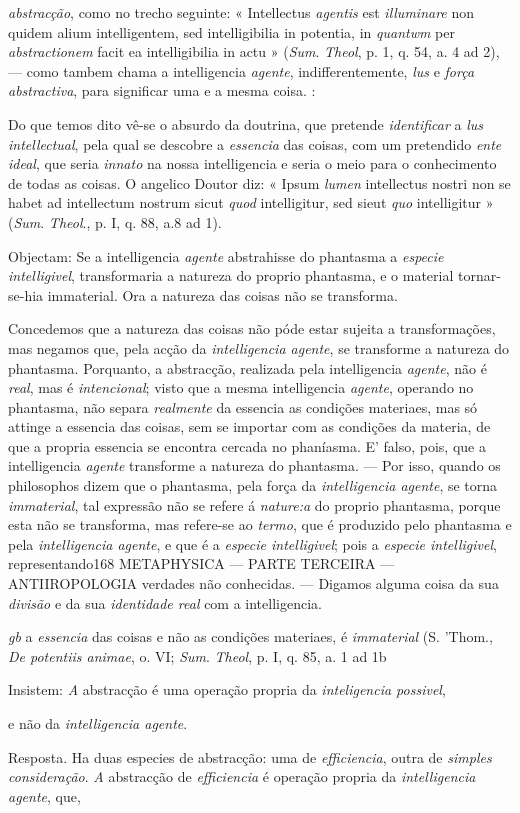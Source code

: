 \emph{abstracção}, como no trecho seguinte: « Intellectus \emph{agentis} est \emph{illuminare} non quidem alium intelligentem, sed intelligibilia in potentia, in \emph{quantwm} per \emph{abstractionem} facit ea intelligibilia in actu » (\emph{Sum}. \emph{Theol}, p. 1, q. 54, a. 4 ad 2), --- como tambem chama a intelligencia \emph{agente}, indifferentemente, \emph{lus} e \emph{força abstractiva}, para significar uma e a mesma coisa. :\par Do que temos dito vê-se o absurdo da doutrina, que pretende \emph{identificar} a \emph{lus intellectual}, pela qual se descobre a \emph{essencia} das coisas, com um pretendido \emph{ente ideal}, que seria \emph{innato} na nossa intelligencia e seria o meio para o conhecimento de todas as coisas. O angelico Doutor diz: « Ipsum \emph{lumen} intellectus nostri non se habet ad intellectum nostrum sicut \emph{quod} intelligitur, sed sieut \emph{quo} intelligitur » (\emph{Sum}. \emph{Theol}., p. I, q. 88, a.8 ad 1).\par Objectam: Se a intelligencia \emph{agente} abstrahisse do phantasma a \emph{especie intelligivel}, transformaria a natureza do proprio phantasma, e o material tornar-se-hia immaterial. Ora a natureza das coisas não se transforma.\par Concedemos que a natureza das coisas não póde estar sujeita a transformações, mas negamos que, pela acção da \emph{intelligencia agente}, se transforme a natureza do phantasma. Porquanto, a abstracção, realizada pela intelligencia \emph{agente}, não é \emph{real}, mas é \emph{intencional}; visto que a mesma intelligencia \emph{agente}, operando no phantasma, não separa \emph{realmente} da essencia as condições materiaes, mas só attinge a essencia das coisas, sem se importar com as condições da materia, de que a propria essencia se encontra cercada no phaníasma. E' falso, pois, que a intelligencia \emph{agente} transforme a natureza do phantasma. --- Por isso, quando os philosophos dizem que o phantasma, pela força da \emph{intelligencia agente}, se torna \emph{immaterial}, tal expressão não se refere á \emph{nature:a} do proprio phantasma, porque esta não se transforma, mas refere-se ao \emph{termo}, que é produzido pelo phantasma e pela \emph{intelligencia agente}, e que é a \emph{especie intelligivel}; pois a \emph{especie intelligivel}, representando168 METAPHYSICA --- PARTE TERCEIRA --- ANTIIROPOLOGIA verdades não conhecidas. --- Digamos alguma coisa da sua \emph{divisão} e da sua \emph{identidade real} com a intelligencia.\par \emph{gb} a \emph{essencia} das coisas e não as condições materiaes, é \emph{immaterial} (S. 'Thom., \emph{De potentiis animae}, o. VI; \emph{Sum}. \emph{Theol}, p. I, q. 85, a. 1 ad 1b \textbar{}\par Insistem: \emph{A} abstracção é uma operação propria da \emph{inteligencia possivel},\par e não da \emph{intelligencia agente}.\par Resposta. Ha duas especies de abstracção: uma de \emph{efficiencia}, outra de \emph{simples consideração}. \emph{A} abstracção de \emph{efficiencia} é operação propria da \emph{intelligencia agente}, que, 